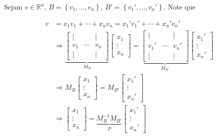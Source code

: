\documentclass{article}
\begin{document}
\par\vspace{0.3cm} Sejam $v\in\mathbb{R}^n$, $B = \left\{v_1, \dots, v_n\right\}$, $B' = \left\{ v_1', \dots, v_n' \right\}$. Note que

\begin{align*}
v &= x_1v_1 + \cdots + x_nv_n = x_1'v_1' + \cdots + x_n'v_n' \\
&\Rightarrow \underbrace{\begin{bmatrix}
\vert & &\vert \\
v_1 & \cdots & v_n \\
\vert &  & \vert
\end{bmatrix}}_{M_B}\begin{bmatrix}
x_1\\
\vdots\\
x_n
\end{bmatrix} = \underbrace{\begin{bmatrix}
\vert & &\vert \\
v_1' & \cdots & v_n' \\
\vert &  & \vert
\end{bmatrix}}_{M_{B'}}\begin{bmatrix}
x_1'\\
\vdots\\
x_n'
\end{bmatrix} \\
&\Rightarrow M_B\begin{bmatrix}
x_1\\
\vdots\\
x_n
\end{bmatrix} = M_{B'}\begin{bmatrix}
x_1'\\
\vdots\\
x_n'
\end{bmatrix} \\
&\Rightarrow \begin{bmatrix}
x_1 \\
\vdots \\
x_n
\end{bmatrix} = \underbrace{M_B^{-1}M_{B'}}_{P}\begin{bmatrix}
x_1'\\
\vdots\\
x_n'
\end{bmatrix}
\end{align*}
\end{document}
